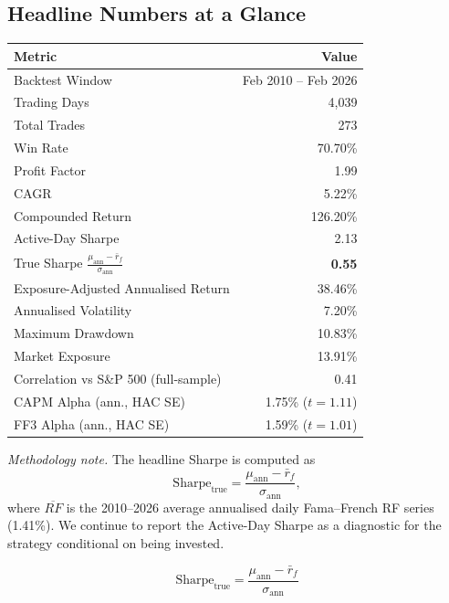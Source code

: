 \documentclass[11pt]{article}
\begin{document}
\subsection*{Headline Numbers at a Glance}

\begin{center}
\small
\begin{tabular}{l r}
\toprule
\textbf{Metric} & \textbf{Value}\\
\midrule
Backtest Window                       & Feb 2010 -- Feb 2026\\
Trading Days                          & 4{,}039\\
Total Trades                          & 273\\
Win Rate                              & 70.70\%\\
Profit Factor                         & 1.99\\
CAGR                                  & 5.22\%\\
Compounded Return                     & 126.20\%\\
Active-Day Sharpe                     & 2.13\\
True Sharpe $\displaystyle \frac{\mu_{\mathrm{ann}}-\bar r_f}{\sigma_{\mathrm{ann}}}$ & \textbf{0.55}\\
Exposure-Adjusted Annualised Return  & 38.46\%\\
Annualised Volatility                 & 7.20\%\\
Maximum Drawdown                      & 10.83\%\\
Market Exposure                       & 13.91\%\\
Correlation vs S\&P 500 (full-sample) & 0.41\\
CAPM Alpha (ann., HAC SE)             & 1.75\% ($t = 1.11$)\\
FF3 Alpha (ann., HAC SE)              & 1.59\% ($t = 1.01$)\\
\bottomrule
\end{tabular}
\end{center}

\footnotesize\textit{Methodology note.} The headline Sharpe is computed as
\[
\mathrm{Sharpe}_{\mathrm{true}}
= \frac{\mu_{\mathrm{ann}} - \bar r_f}{\sigma_{\mathrm{ann}}},
\]
where $\overline{RF}$ is
the 2010--2026 average annualised daily Fama--French RF series
(1.41\%). We continue to report the Active-Day Sharpe as a diagnostic for
the strategy conditional on being invested.\normalsize

\begin{equation}
\mathrm{Sharpe}_{\mathrm{true}}
= \frac{\mu_{\mathrm{ann}} - \bar r_f}{\sigma_{\mathrm{ann}}}
\end{equation}
\end{document}
